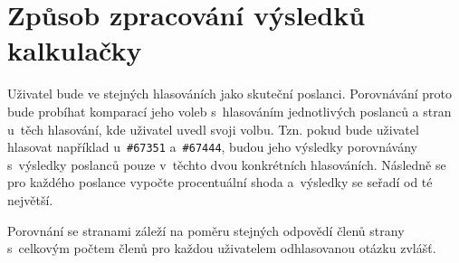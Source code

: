 \section{Způsob zpracování výsledků kalkulačky}
Uživatel bude  ve stejných hlasováních jako skuteční poslanci. Porovnávání proto bude probíhat komparací jeho voleb s~hlasováním jednotlivých poslanců a stran u~těch hlasování, kde uživatel uvedl svoji volbu. Tzn. pokud bude uživatel hlasovat například u~\texttt{\#67351} a~\texttt{\#67444}, budou jeho výsledky porovnávány s~výsledky poslanců pouze v~těchto dvou konkrétních hlasováních. Následně se pro každého poslance vypočte procentuální shoda a~výsledky se seřadí od té největší.

\par Porovnání se stranami záleží na poměru stejných odpovědí členů strany s~celkovým počtem členů pro každou uživatelem odhlasovanou otázku zvlášť.



